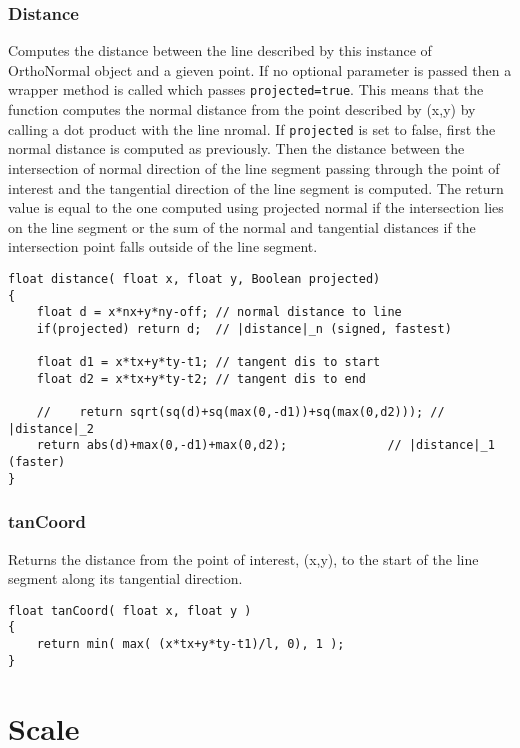 \documentclass[notitlepage]{article}
\begin{document}
\subsubsection{Distance}

Computes the distance between the line described by this instance of OrthoNormal object
and a gieven point. If no optional parameter is passed then a wrapper method is called
which passes \texttt{projected=true}. This means that the function computes the normal
distance from the point described by (x,y) by calling a dot product with the line nromal.
If \texttt{projected} is set to false, first the normal distance is computed as previously.
Then the distance between the intersection of normal direction of the line segment passing
through the point of interest and the tangential direction of the line segment is computed.
The return value is equal to the one computed using projected normal if the intersection
lies on the line segment or the sum of the normal and tangential distances if the
intersection point falls outside of the line segment.

\begin{lstlisting}[style=myCpp]
float distance( float x, float y, Boolean projected)
{
	float d = x*nx+y*ny-off; // normal distance to line 
	if(projected) return d;  // |distance|_n (signed, fastest)

	float d1 = x*tx+y*ty-t1; // tangent dis to start
	float d2 = x*tx+y*ty-t2; // tangent dis to end

	//    return sqrt(sq(d)+sq(max(0,-d1))+sq(max(0,d2))); // |distance|_2
	return abs(d)+max(0,-d1)+max(0,d2);              // |distance|_1 (faster)
}
\end{lstlisting}

\subsubsection{tanCoord}

Returns the distance from the point of interest, (x,y), to the start of the line segment
along its tangential direction.

\begin{lstlisting}[style=myCpp]
float tanCoord( float x, float y )
{
	return min( max( (x*tx+y*ty-t1)/l, 0), 1 );
}
\end{lstlisting}

\section{Scale}
\end{document}
